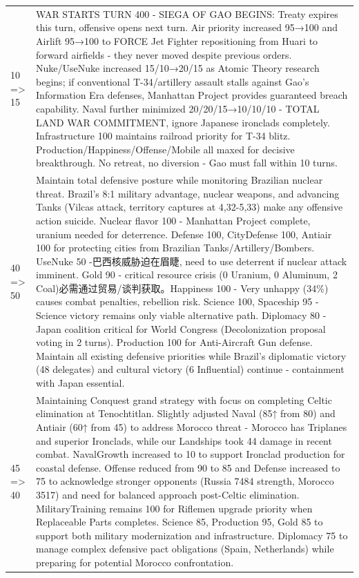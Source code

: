 \begin{longtable}{p{}p{}}
10 => 15 & WAR STARTS TURN 400 - SIEGA OF GAO BEGINS: Treaty expires this turn, offensive opens next turn. Air priority increased 95→100 and Airlift 95→100 to FORCE Jet Fighter repositioning from Huari to forward airfields - they never moved despite previous orders. Nuke/UseNuke increased 15/10→20/15 as Atomic Theory research begins; if conventional T-34/artillery assault stalls against Gao's Information Era defenses, Manhattan Project provides guaranteed breach capability. Naval further minimized 20/20/15→10/10/10 - TOTAL LAND WAR COMMITMENT, ignore Japanese ironclads completely. Infrastructure 100 maintains railroad priority for T-34 blitz. Production/Happiness/Offense/Mobile all maxed for decisive breakthrough. No retreat, no diversion - Gao must fall within 10 turns. \\
40 => 50 & Maintain total defensive posture while monitoring Brazilian nuclear threat. Brazil's 8:1 military advantage, nuclear weapons, and advancing Tanks (Vilcas attack, territory captures at 4,32-5,33) make any offensive action suicide. Nuclear flavor 100 - Manhattan Project complete, uranium needed for deterrence. Defense 100, CityDefense 100, Antiair 100 for protecting cities from Brazilian Tanks/Artillery/Bombers. UseNuke 50 -巴西核威胁迫在眉睫, need to use deterrent if nuclear attack imminent. Gold 90 - critical resource crisis (0 Uranium, 0 Aluminum, 2 Coal)必需通过贸易/谈判获取。Happiness 100 - Very unhappy (34\%) causes combat penalties, rebellion risk. Science 100, Spaceship 95 - Science victory remains only viable alternative path. Diplomacy 80 - Japan coalition critical for World Congress (Decolonization proposal voting in 2 turns). Production 100 for Anti-Aircraft Gun defense. Maintain all existing defensive priorities while Brazil's diplomatic victory (48 delegates) and cultural victory (6 Influential) continue - containment with Japan essential. \\
45 => 40 & Maintaining Conquest grand strategy with focus on completing Celtic elimination at Tenochtitlan. Slightly adjusted Naval (85↑ from 80) and Antiair (60↑ from 45) to address Morocco threat - Morocco has Triplanes and superior Ironclads, while our Landships took 44 damage in recent combat. NavalGrowth increased to 10 to support Ironclad production for coastal defense. Offense reduced from 90 to 85 and Defense increased to 75 to acknowledge stronger opponents (Russia 7484 strength, Morocco 3517) and need for balanced approach post-Celtic elimination. MilitaryTraining remains 100 for Riflemen upgrade priority when Replaceable Parts completes. Science 85, Production 95, Gold 85 to support both military modernization and infrastructure. Diplomacy 75 to manage complex defensive pact obligations (Spain, Netherlands) while preparing for potential Morocco confrontation. \\

\end{longtable}
